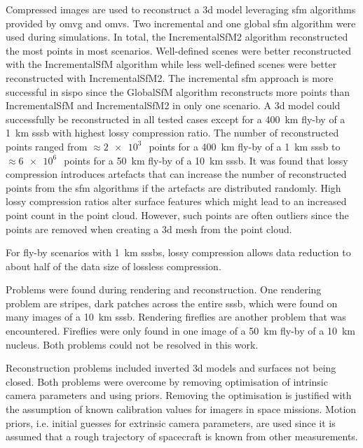 Compressed images are used to reconstruct a \gls{3d} model leveraging \gls{sfm} algorithms provided by \gls{omvg} and \gls{omvs}. Two incremental and one global \gls{sfm} algorithm were used during simulations. In total, the IncrementalSfM2 algorithm reconstructed the most points in most scenarios. Well-defined scenes were better reconstructed with the IncrementalSfM algorithm while less well-defined scenes were better reconstructed with IncrementalSfM2. The incremental \gls{sfm} approach is more successful in \gls{sispo} since the GlobalSfM algorithm reconstructs more points than IncrementalSfM and IncrementalSfM2 in only one scenario. A \gls{3d} model could successfully be reconstructed in all tested cases except for a \SI{400}{\kilo\meter} fly-by of a \SI{1}{\kilo\meter} \gls{sssb} with highest lossy compression ratio. The number of reconstructed points ranged from $\approx \SI{2e3}{}$~points for a \SI{400}{\kilo\meter} fly-by of a \SI{1}{\kilo\meter} \gls{sssb} to $\approx \SI{6e6}{}$~points for a \SI{50}{\kilo\meter} fly-by of a \SI{10}{\kilo\meter} \gls{sssb}. It was found that lossy compression introduces artefacts that can increase the number of reconstructed points from the \gls{sfm} algorithms if the artefacts are distributed randomly. High lossy compression ratios alter surface features which might lead to an increased point count in the point cloud. However, such points are often outliers since the points are removed when creating a \gls{3d} mesh from the point cloud.

For fly-by scenarios with \SI{1}{\kilo\meter} \glspl{sssb}, lossy compression allows data reduction to about half of the data size of lossless compression. 

Problems were found during rendering and reconstruction. One rendering problem are stripes, dark patches across the entire \gls{sssb}, which were found on many images of a \SI{10}{\kilo\meter} \gls{sssb}. Rendering fireflies are another problem that was encountered. Fireflies  were only found in one image of a \SI{50}{\kilo\meter} fly-by of a \SI{10}{\kilo\meter} nucleus. Both problems could not be resolved in this work.

Reconstruction problems included inverted \gls{3d} models and surfaces not being closed. Both problems were overcome by removing optimisation of intrinsic camera parameters and using priors. Removing the optimisation is justified with the assumption of known calibration values for imagers in space missions. Motion priors, i.e. initial guesses for extrinsic camera parameters, are used since it is assumed that a rough trajectory of spacecraft is known from other measurements.

